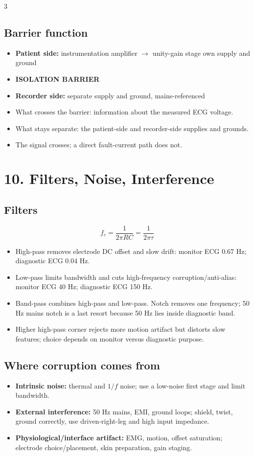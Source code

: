 \documentclass[10pt,a4paper]{ctexart}
\newcommand{\key}[1]{\textbf{#1}}
\newcommand{\formula}[1]{%
  \par\vspace{1pt}%
  \begingroup
  \setlength{\abovedisplayskip}{0pt}%
  \setlength{\belowdisplayskip}{0pt}%
  \[
    #1
  \]
  \endgroup
  \vspace{1pt}%
}
\begin{document}
\begin{multicols*}{3}
\subsection{Barrier function}
\begin{itemize}
  \item \key{Patient side:} instrumentation amplifier $\rightarrow$ unity-gain stage own supply and ground
  \item \key{ISOLATION BARRIER}
  \item \key{Recorder side:} separate supply and ground, mains-referenced
  \item What crosses the barrier: information about the measured ECG voltage.
  \item What stays separate: the patient-side and recorder-side supplies and grounds.
  \item The signal crosses; a direct fault-current path does not.
\end{itemize}


\section{10. Filters, Noise, Interference}
\subsection{Filters}
\formula{\displaystyle
  f_c=\frac{1}{2\pi RC}=\frac{1}{2\pi\tau}}
\begin{itemize}
  \item High-pass removes electrode DC offset and slow drift:
  monitor ECG 0.67 Hz; diagnostic ECG 0.04 Hz.
  \item Low-pass limits bandwidth and cuts high-frequency corruption/anti-alias:
  monitor ECG 40 Hz; diagnostic ECG 150 Hz.
  \item Band-pass combines high-pass and low-pass. Notch removes one frequency;
  50 Hz mains notch is a last resort because 50 Hz lies inside diagnostic band.
  \item Higher high-pass corner rejects more motion artifact but distorts slow
  features; choice depends on monitor versus diagnostic purpose.
\end{itemize}

\subsection{Where corruption comes from}
\begin{itemize}
  \item \key{Intrinsic noise:} thermal and $1/f$ noise; use a low-noise first
  stage and limit bandwidth.
  \item \key{External interference:} 50 Hz mains, EMI, ground loops; shield,
  twist, ground correctly, use driven-right-leg and high input impedance.
  \item \key{Physiological/interface artifact:} EMG, motion, offset saturation;
  electrode choice/placement, skin preparation, gain staging.
\end{itemize}


\end{multicols*}
\end{document}
